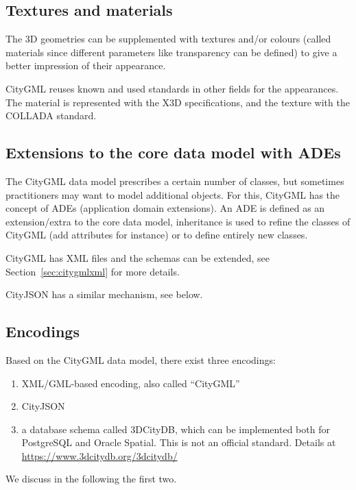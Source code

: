 \subsection{Textures and materials}
The 3D geometries can be supplemented with textures and/or colours (called materials since different parameters like transparency can be defined) to give a better impression of their appearance.

CityGML reuses known and used standards in other fields for the appearances.
The material is represented with the X3D specifications, and the texture with the COLLADA standard.


\subsection{Extensions to the core data model with ADEs} 

The CityGML data model prescribes a certain number of classes, but sometimes practitioners may want to model additional objects.
For this, CityGML has the concept of ADEs (application domain extensions).
An ADE is defined as an extension/extra to the core data model, inheritance is used to refine the classes of CityGML (add attributes for instance) or to define entirely new classes.

CityGML has XML files and the schemas can be extended, see Section~\ref{sec:citygmlxml} for more details. 

CityJSON has a similar mechanism, see below.








\subsection{Encodings}

Based on the CityGML data model, there exist three encodings:
\begin{enumerate}
  \item XML/GML-based encoding, also called ``CityGML''
  \item CityJSON
  \item a database schema called 3DCityDB, which can be implemented both for PostgreSQL and Oracle Spatial. This is not an official standard. Details at \url{https://www.3dcitydb.org/3dcitydb/}
\end{enumerate}
We discuss in the following the first two.


